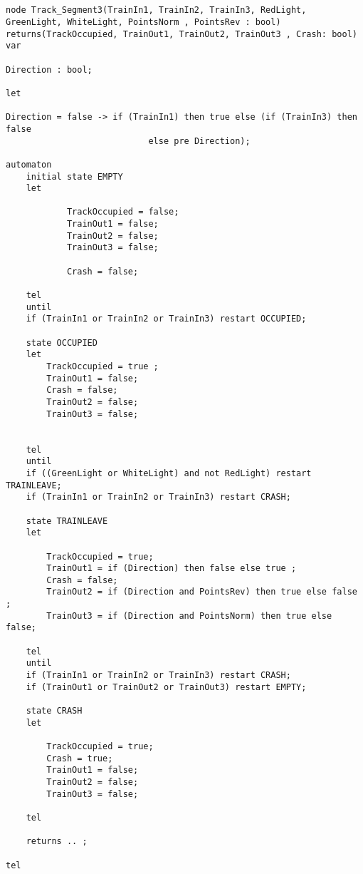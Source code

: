 \begin{verbatim}


node Track_Segment3(TrainIn1, TrainIn2, TrainIn3, RedLight, 
GreenLight, WhiteLight, PointsNorm , PointsRev : bool)
returns(TrackOccupied, TrainOut1, TrainOut2, TrainOut3 , Crash: bool)
var

Direction : bool;

let

Direction = false -> if (TrainIn1) then true else (if (TrainIn3) then false 
							else pre Direction); 

automaton
	initial state EMPTY
	let
	
			TrackOccupied = false; 
			TrainOut1 = false; 
			TrainOut2 = false;
			TrainOut3 = false;
			
			Crash = false;
	
	tel
	until
	if (TrainIn1 or TrainIn2 or TrainIn3) restart OCCUPIED;
	
	state OCCUPIED
	let
		TrackOccupied = true ;
		TrainOut1 = false;
		Crash = false;
		TrainOut2 = false;
		TrainOut3 = false;
	 
	
	tel
	until
	if ((GreenLight or WhiteLight) and not RedLight) restart TRAINLEAVE;
	if (TrainIn1 or TrainIn2 or TrainIn3) restart CRASH;
	
	state TRAINLEAVE
	let
	
		TrackOccupied = true;
		TrainOut1 = if (Direction) then false else true ;
		Crash = false;
		TrainOut2 = if (Direction and PointsRev) then true else false ;
		TrainOut3 = if (Direction and PointsNorm) then true else false;
	
	tel
	until
	if (TrainIn1 or TrainIn2 or TrainIn3) restart CRASH;
	if (TrainOut1 or TrainOut2 or TrainOut3) restart EMPTY;
	
	state CRASH
	let
	
		TrackOccupied = true;
		Crash = true;
		TrainOut1 = false;
		TrainOut2 = false;
		TrainOut3 = false;
	
	tel
	
	returns .. ;

tel


\end{verbatim}



